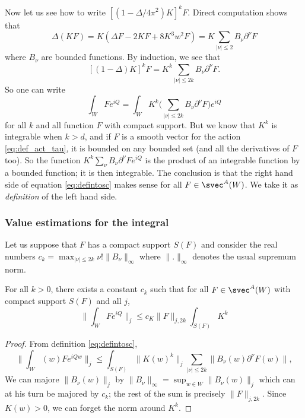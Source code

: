 Now let us see how to write $[(1-\Delta/4\pi^2)K]^kF$. Direct computation shows that
\[
	\Delta(KF)=K(\Delta F-2KF+8K^3w^2F)=K\sum_{| \nu |\leq 2}B_{\nu}\partial^{\nu}F
\]
where $B_{\nu}$ are bounded functions. By induction, we see that
\[
	[(1-\Delta )K]^kF=K^k\sum_{| \nu |\leq 2k}B_{\nu}\partial^{\nu}F.
\]
So one can write
\begin{equation} \label{eq:defintosc}
	\int_WFe^{iQ}=\int_WK^k\big( \sum_{| \nu |\leq 2k}B_{\nu}\partial^{\nu}F \big)e^{iQ}
\end{equation}
for all $k$ and all function $F$ with compact support. But we know that $K^k$ is integrable when $k>d$, and if $F$ is  a smooth vector for the action \eqref{eq:def_act_tau}, it is bounded on any bounded set (and all the derivatives of $F$ too). So the function $K^k\sum_{\nu}B_{\nu}\partial^{\nu}Fe^{iQ}$ is the product of an integrable function by a bounded function; it is then integrable. The conclusion is that the right hand side of equation \eqref{eq:defintosc} makes sense for all $F\in\svec^A(W)$. We take it as \emph{definition} of the left hand side.

\subsubsection{Value estimations for the integral}

Let us suppose that $F$ has a compact support $S(F)$ and consider the real numbers $c_k=\max_{| \nu |\leq 2k}\nu!\| B_{\nu} \|_{\infty}$ where $\| . \|_{\infty}$ denotes the usual supremum norm.

\begin{lemma} \label{lem:born_osci_un}
	For all $k>0$, there exists a constant $c_k$ such that for all $F\in\svec^A(W)$ with compact support $S(F)$ and all $j$,
	\[
		\| \int_WFe^{iQ} \|_j\leq c_K\| F \|_{j,2k}\int_{S(F)}K^k
	\]
\end{lemma}

\begin{proof}

	From definition \eqref{eq:defintosc},
	\begin{equation}
		\| \int_W(w)Fe^{iQw} \|_j \leq\int_{S(F)}\| K(w)^k \|_j\sum_{| \nu |\leq 2k} \|B_{\nu}(w)\partial^{\nu}F(w) \|,
	\end{equation}
	We can majore $\|B_{\nu}(w)\|_j$ by $\| B_{\nu} \|_{\infty}=\sup_{w\in W}\| B_{\nu}(w) \|_j$ which can at his turn be majored by $c_k$; the rest of the sum  is precisely $\| F \|_{j,2k}$. Since $K(w)>0$, we can forget the norm around $K^k$.

\end{proof}

